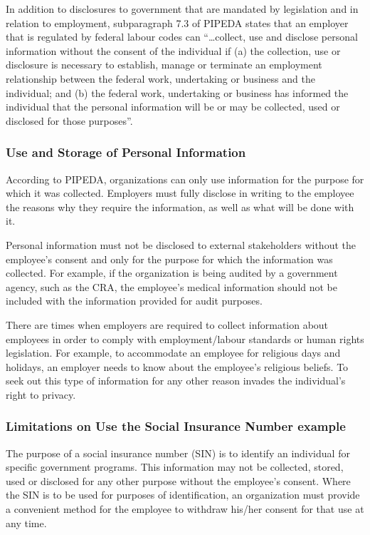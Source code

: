 \documentclass[letterpaper,10pt,english]{sphinxmanual}
\begin{document}
\sphinxAtStartPar
In addition to disclosures to government that are mandated by legislation and in relation to
employment, subparagraph 7.3 of PIPEDA states that an employer that is regulated by
federal labour codes can “…collect, use and disclose personal information without the consent of the individual if
(a) the collection, use or disclosure is necessary to establish, manage or terminate an
employment relationship between the federal work, undertaking or business and the
individual; and
(b) the federal work, undertaking or business has informed the individual that the personal
information will be or may be collected, used or disclosed for those purposes”.


\subsubsection{Use and Storage of Personal Information}
\label{\detokenize{2_compliance:use-and-storage-of-personal-information}}
\sphinxAtStartPar
According to PIPEDA, organizations can only use information for the purpose for which it
was collected. Employers must fully disclose in writing to the employee the reasons why
they require the information, as well as what will be done with it.

\sphinxAtStartPar
Personal information must not be disclosed to external stakeholders without the employee’s
consent and only for the purpose for which the information was collected. For example, if the
organization is being audited by a government agency, such as the CRA, the employee’s
medical information should not be included with the information provided for audit purposes.

\sphinxAtStartPar
There are times when employers are required to collect information about employees in order
to comply with employment/labour standards or human rights legislation. For example, to
accommodate an employee for religious days and holidays, an employer needs to know about
the employee’s religious beliefs. To seek out this type of information for any other reason
invades the individual’s right to privacy.


\subsubsection{Limitations on Use \sphinxhyphen{} the Social Insurance Number example}
\label{\detokenize{2_compliance:limitations-on-use-the-social-insurance-number-example}}
\sphinxAtStartPar
The purpose of a social insurance number (SIN) is to identify an individual for specific
government programs. This information may not be collected, stored, used or disclosed for
any other purpose without the employee’s consent. Where the SIN is to be used for purposes
of identification, an organization must provide a convenient method for the employee to
withdraw his/her consent for that use at any time.
\end{document}
